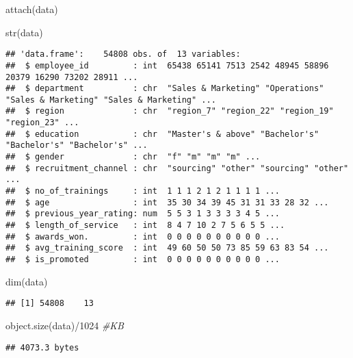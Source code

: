\documentclass[
]{article}
\newenvironment{Shaded}{\begin{snugshade}}{\end{snugshade}}
\newcommand{\CommentTok}[1]{\textcolor[rgb]{0.56,0.35,0.01}{\textit{#1}}}
\newcommand{\DecValTok}[1]{\textcolor[rgb]{0.00,0.00,0.81}{#1}}
\newcommand{\FunctionTok}[1]{\textcolor[rgb]{0.00,0.00,0.00}{#1}}
\newcommand{\NormalTok}[1]{#1}
\newcommand{\SpecialCharTok}[1]{\textcolor[rgb]{0.00,0.00,0.00}{#1}}
\begin{document}
\begin{Shaded}
\begin{Highlighting}[]
\FunctionTok{attach}\NormalTok{(data)}
\end{Highlighting}
\end{Shaded}

\begin{Shaded}
\begin{Highlighting}[]
\FunctionTok{str}\NormalTok{(data)}
\end{Highlighting}
\end{Shaded}

\begin{verbatim}
## 'data.frame':    54808 obs. of  13 variables:
##  $ employee_id         : int  65438 65141 7513 2542 48945 58896 20379 16290 73202 28911 ...
##  $ department          : chr  "Sales & Marketing" "Operations" "Sales & Marketing" "Sales & Marketing" ...
##  $ region              : chr  "region_7" "region_22" "region_19" "region_23" ...
##  $ education           : chr  "Master's & above" "Bachelor's" "Bachelor's" "Bachelor's" ...
##  $ gender              : chr  "f" "m" "m" "m" ...
##  $ recruitment_channel : chr  "sourcing" "other" "sourcing" "other" ...
##  $ no_of_trainings     : int  1 1 1 2 1 2 1 1 1 1 ...
##  $ age                 : int  35 30 34 39 45 31 31 33 28 32 ...
##  $ previous_year_rating: num  5 5 3 1 3 3 3 3 4 5 ...
##  $ length_of_service   : int  8 4 7 10 2 7 5 6 5 5 ...
##  $ awards_won.         : int  0 0 0 0 0 0 0 0 0 0 ...
##  $ avg_training_score  : int  49 60 50 50 73 85 59 63 83 54 ...
##  $ is_promoted         : int  0 0 0 0 0 0 0 0 0 0 ...
\end{verbatim}

\begin{Shaded}
\begin{Highlighting}[]
\FunctionTok{dim}\NormalTok{(data)}
\end{Highlighting}
\end{Shaded}

\begin{verbatim}
## [1] 54808    13
\end{verbatim}

\begin{Shaded}
\begin{Highlighting}[]
\FunctionTok{object.size}\NormalTok{(data)}\SpecialCharTok{/}\DecValTok{1024} \CommentTok{\#KB}
\end{Highlighting}
\end{Shaded}

\begin{verbatim}
## 4073.3 bytes
\end{verbatim}
\end{document}
